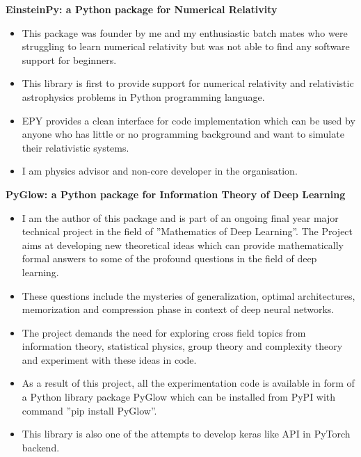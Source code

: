 \documentclass[a4paper]{article}
\begin{document}
\vspace*{2mm}
\textbf{EinsteinPy: a Python package for Numerical Relativity} \\
\begin{itemize}
    \item This package was founder by me and my enthusiastic batch mates who were struggling to learn numerical relativity but was not able to find any software support for beginners.
    \item This library is first to provide support for numerical relativity and relativistic astrophysics problems in Python programming language.
    \item EPY provides a clean interface for code implementation which can be used by anyone who has little or no programming background and want to simulate their relativistic systems.
    \item I am physics advisor and non-core developer in the organisation.
\end{itemize}
\vspace*{2mm}

\textbf{PyGlow: a Python package for Information Theory of Deep Learning} \\
\begin{itemize}
    \item I am the author of this package and is part of an ongoing final year major technical project in the field of ”Mathematics of Deep Learning”. The Project aims at developing new theoretical ideas which can provide mathematically formal answers to some of the profound questions in the field of deep learning.
    \item These questions include the mysteries of generalization, optimal architectures, memorization and compression phase in context of deep neural networks.
    \item The project demands the need for exploring cross field topics from information theory, statistical physics, group theory and complexity theory and experiment with these ideas in code.
    \item As a result of this project, all the experimentation code is available in form of a Python library package PyGlow which can be installed from PyPI with command ”pip install PyGlow”.
    \item This library is also one of the attempts to develop keras like API in PyTorch backend.
\end{itemize}
\vspace*{2mm}
\end{document}
